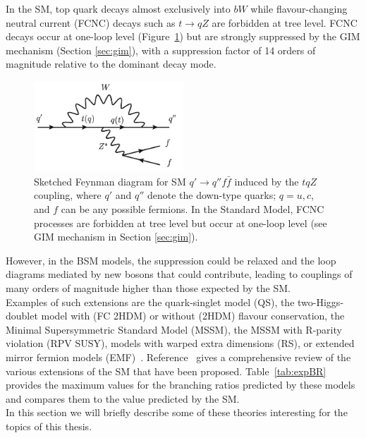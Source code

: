 In the SM, top quark decays almost exclusively into $bW$ while flavour-changing neutral current (FCNC) decays such as $t\rightarrow qZ$ are forbidden at tree level. 
FCNC decays occur at one-loop level (Figure~\ref{fig:tqZ_fey}) but are strongly suppressed by the GIM mechanism (Section \ref{sec:gim}), with a suppression factor of 14 orders of
magnitude relative to the dominant decay mode\cite{tcZ_sm}.
\begin{figure}[!h]
	\centering
	\includegraphics[width=0.5\textwidth]{Chapters/CH1/figures/tqZ_fey}
	\caption{Sketched Feynman diagram for SM $q' \rightarrow q'' f \bar{f}$ induced by the $tqZ$ coupling, where $q'$ and $q''$ denote the down-type quarks; $q = u, c$, and $f$ can be any possible fermions. In the Standard Model, FCNC processes are forbidden at tree level but occur at one-loop level (see GIM mechanism in Section \ref{sec:gim}).}
	\label{fig:tqZ_fey}
\end{figure}
\newline However, in the BSM models, the suppression could be relaxed and the loop diagrams mediated by new bosons that could contribute, 
leading to couplings of many orders of magnitude higher than those expected by the SM.\\
Examples of such extensions are the quark-singlet model (QS)\cite{qs_limit}, the two-Higgs-doublet model with (FC 2HDM) or without (2HDM) flavour conservation\cite{h2dm_limit},
the Minimal Supersymmetric Standard Model (MSSM)\cite{mssm_limit}, the MSSM with R-parity violation (RPV SUSY)\cite{RPV_limit}, models with warped extra dimensions (RS)\cite{extra_limit}, or extended mirror fermion models (EMF)~\cite{rs_limit}.
Reference~\cite{report_limit} gives a comprehensive review of the various extensions of the SM that have been proposed.
Table~\ref{tab:expBR} provides the maximum values for the branching ratios  predicted by these models and compares them to the value predicted by the SM.\\
In this section we will briefly describe some of these theories interesting for the topics of this thesis.
